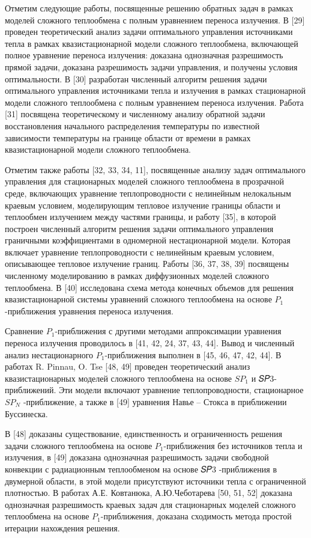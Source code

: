 Отметим следующие работы, посвященные решению обратных задач в
рамках моделей сложного теплообмена с полным уравнением переноса излучения.
В [29] проведен теоретический анализ задачи оптимального управления
источниками тепла в рамках квазистационарной модели сложного теплообмена, включающей полное уравнение
переноса излучения: доказана однозначная разрешимость прямой задачи,
доказана разрешимость задачи управления, и получены условия оптимальности.
В [30] разработан численный алгоритм решения задачи оптимального управления источниками тепла и излучения в рамках
стационарной модели сложного теплообмена с полным уравнением переноса излучения.
Работа [31] посвящена теоретическому и численному анализу обратной
задачи восстановления начального распределения температуры по известной
зависимости температуры на границе области от времени в рамках квазистационарной модели сложного теплообмена.


Отметим также работы [32, 33, 34, 11], посвященные анализу задач оптимального управления для стационарных
моделей сложного теплообмена в прозрачной среде, включающих уравнение теплопроводности с нелинейным
нелокальным краевым условием, моделирующим тепловое излучение границы
области и теплообмен излучением между частями границы, и работу [35], в которой построен численный
алгоритм решения задачи оптимального управления граничными коэффициентами в одномерной нестационарной модели.
Которая включает уравнение теплопроводности с нелинейным краевым условием, описывающее тепловое излучение границ.
Работы [36, 37, 38, 39] посвящены численному моделированию в рамках диффузионных моделей сложного теплообмена.
В [40] исследована схема метода конечных объемов для решения квазистационарной системы
уравнений сложного теплообмена на основе $P_1$-приближения уравнения переноса излучения.


Сравнение $P_1$-приближения с другими методами аппроксимации уравнения переноса излучения проводилось
в [41, 42, 24, 37, 43, 44].
Вывод и численный анализ нестационарного $P_1$-приближения выполнен в [45, 46, 47, 42, 44].
В работах R. Pinnau, O. Tse [48, 49] проведен теоретический
анализ квазистационарных моделей сложного теплообмена на основе $SP_1$ и 𝑆𝑃3-приближений.
Эти модели включают уравнение теплопроводности, стационарное $SP_N$ -приближение,
а также в [49] уравнения Навье – Стокса в приближении Буссинеска.


В [48] доказаны существование, единственность и ограниченность решения задачи сложного
теплообмена на основе $P_1$-приближения без источников
тепла и излучения, в [49] доказана однозначная разрешимость задачи свободной
конвекции с радиационным теплообменом на основе 𝑆𝑃3 -приближения в двумерной области,
в этой модели присутствуют источники тепла с ограниченной плотностью.
В работах А.Е. Ковтанюка, А.Ю.Чеботарева [50, 51, 52] доказана
однозначная разрешимость краевых задач для стационарных моделей сложного теплообмена
на основе $P_1$-приближения, доказана сходимость метода простой итерации нахождения решения.


